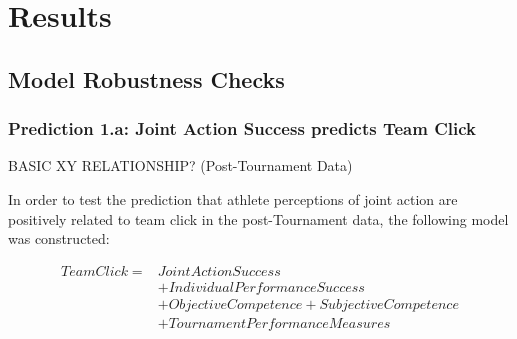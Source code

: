 {\section{\label{app5:results}Results}
\subsection{\label{app5:modelRobustness}Model Robustness Checks}


\subsubsection{Prediction 1.a: Joint Action Success predicts Team Click}

BASIC XY RELATIONSHIP? (Post-Tournament Data)

In order to test the prediction that athlete perceptions of joint action are positively related to team click in the post-Tournament data, the following model was constructed:

\begin{equation}
  \begin{align*}
    Team Click =  & Joint Action Success\\
              & + Individual Performance Success \\
              & + Objective Competence + Subjective Competence\\
              & + TournamentPerformanceMeasures \\
  \end{align*}
\end{equation}
\bigskip


}
